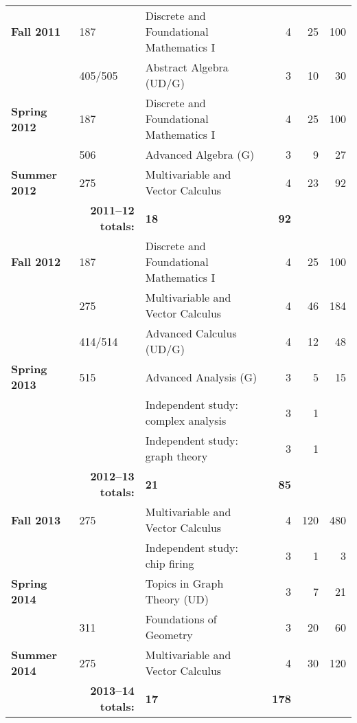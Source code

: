 \documentclass[12pt]{article}
\begin{document}
{\begin{center}
\begin{longtable}{@{} l l l rrr @{}}
\textbf{Fall 2011} & 187 & Discrete and Foundational Mathematics I & 4 & 25 & 100 \\
 & 405/505 & Abstract Algebra (UD/G) & 3 & 10 & 30 \\
\addlinespace[0.1in]

\textbf{Spring 2012} & 187 & Discrete and Foundational Mathematics I & 4 & 25 & 100 \\
 & 506 & Advanced Algebra (G) & 3 & 9 & 27 \\
\addlinespace[0.1in]

\textbf{Summer 2012} & 275 & Multivariable and Vector Calculus & 4 & 23 & 92 \\
 \cmidrule{2-4}
 & \multicolumn{1}{r}{\textbf{2011--12 totals:}} & \textbf{18} & \textbf{92} \\
 \cmidrule{2-4}

\textbf{Fall 2012} & 187 & Discrete and Foundational Mathematics I & 4 & 25 & 100 \\
 & 275 & Multivariable and Vector Calculus & 4 & 46 & 184 \\
 & 414/514 & Advanced Calculus (UD/G) & 4 & 12 & 48 \\
\addlinespace[0.1in]

\textbf{Spring 2013} & 515 & Advanced Analysis (G) & 3 & 5 & 15 \\
 & & Independent study: complex analysis & 3 & 1 \\
 & & Independent study: graph theory & 3 & 1 \\
 \cmidrule{2-4}
 & \multicolumn{1}{r}{\textbf{2012--13 totals:}} & \textbf{21} & \textbf{85} \\
 \cmidrule{2-4}

\textbf{Fall 2013} & 275 & Multivariable and Vector Calculus & 4 & 120 & 480 \\
 & & Independent study: chip firing & 3 & 1 & 3 \\
\addlinespace[0.1in]

\textbf{Spring 2014} & & Topics in Graph Theory (UD) & 3 & 7 & 21 \\
 & 311 & Foundations of Geometry & 3 & 20 & 60 \\
\addlinespace[0.1in]

\textbf{Summer 2014} & 275 & Multivariable and Vector Calculus & 4 & 30 & 120 \\
 \cmidrule{2-4}
 & \multicolumn{1}{r}{\textbf{2013--14 totals:}} & \textbf{17} & \textbf{178} \\
 \cmidrule{2-4}


\end{longtable}
\end{center}}
\end{document}
